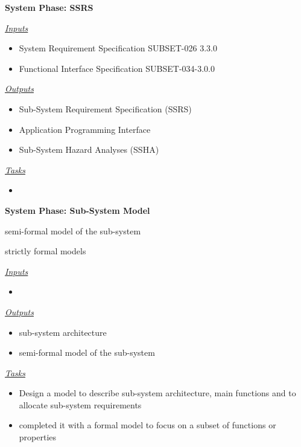 \documentclass{template/openetcs_article}
\begin{document}

\begin{description}
\item \textbf{System Phase: SSRS}

\underline{\textit{Inputs}}
\begin{itemize}
\item System Requirement Specification SUBSET-026 3.3.0
\item Functional Interface Specification SUBSET-034-3.0.0
\end{itemize}


\underline{\textit{Outputs}}
\begin{itemize}
\item Sub-System Requirement Specification
(SSRS)
\item Application Programming Interface
\item Sub-System Hazard Analyses (SSHA)
\end{itemize}

\underline{\textit{Tasks}}
\begin{itemize}
\item 
\end{itemize}
\end{description}

\begin{description}
\item \textbf{System Phase: Sub-System Model}

\begin{description}
\item semi-formal model of the sub-system
\item strictly formal models
\end{description}

\underline{\textit{Inputs}}
\begin{itemize}
\item 
\end{itemize}

\underline{\textit{Outputs}}
\begin{itemize}
\item sub-system architecture
\item semi-formal model of the sub-system
\end{itemize}

\underline{\textit{Tasks}}
\begin{itemize}
\item Design a model to describe sub-system architecture, main functions and to allocate sub-system requirements
\item completed it with a formal model to focus on a subset of functions or properties
\end{itemize}
\end{description}
\end{document}
